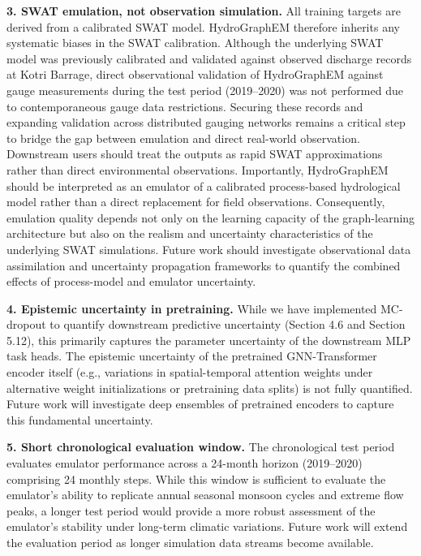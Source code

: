 \documentclass[preprint,12pt]{elsarticle}
\begin{document}
\textbf{3. SWAT emulation, not observation simulation.} All training targets are derived from a calibrated SWAT model. HydroGraphEM therefore inherits any systematic biases in the SWAT calibration. Although the underlying SWAT model was previously calibrated and validated against observed discharge records at Kotri Barrage, direct observational validation of HydroGraphEM against gauge measurements during the test period (2019--2020) was not performed due to contemporaneous gauge data restrictions. Securing these records and expanding validation across distributed gauging networks remains a critical step to bridge the gap between emulation and direct real-world observation. Downstream users should treat the outputs as rapid SWAT approximations rather than direct environmental observations. Importantly, HydroGraphEM should be interpreted as an emulator of a calibrated process-based hydrological model rather than a direct replacement for field observations. Consequently, emulation quality depends not only on the learning capacity of the graph-learning architecture but also on the realism and uncertainty characteristics of the underlying SWAT simulations. Future work should investigate observational data assimilation and uncertainty propagation frameworks to quantify the combined effects of process-model and emulator uncertainty.

\textbf{4. Epistemic uncertainty in pretraining.} While we have implemented MC-dropout to quantify downstream predictive uncertainty (Section 4.6 and Section 5.12), this primarily captures the parameter uncertainty of the downstream MLP task heads. The epistemic uncertainty of the pretrained GNN-Transformer encoder itself (e.g., variations in spatial-temporal attention weights under alternative weight initializations or pretraining data splits) is not fully quantified. Future work will investigate deep ensembles of pretrained encoders to capture this fundamental uncertainty.

\textbf{5. Short chronological evaluation window.} The chronological test period evaluates emulator performance across a 24-month horizon (2019--2020) comprising 24 monthly steps. While this window is sufficient to evaluate the emulator's ability to replicate annual seasonal monsoon cycles and extreme flow peaks, a longer test period would provide a more robust assessment of the emulator's stability under long-term climatic variations. Future work will extend the evaluation period as longer simulation data streams become available.
\end{document}
